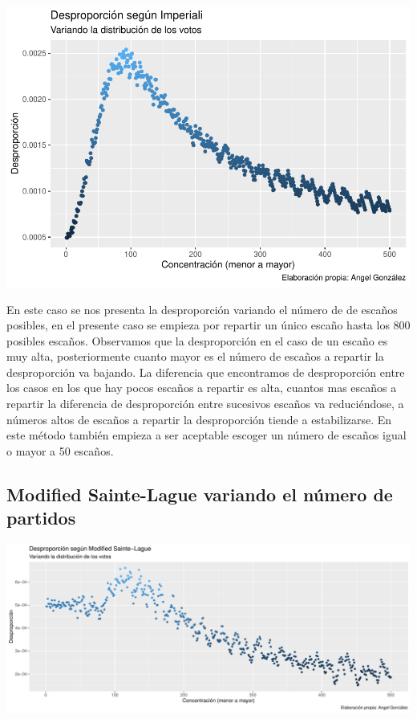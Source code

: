 \documentclass[12pt,a4paper,]{book}
\numberwithin{dummy}{section}
\theoremstyle{ocrenumbox}
\theoremstyle{blacknumex}
\theoremstyle{blacknumbox}
\theoremstyle{ocrenum}
\theoremstyle{ocrenum}
\begin{document}
\begin{center}\includegraphics[width=0.95\linewidth]{figurasR/unnamed-chunk-23-1} \end{center}

En este caso se nos presenta la desproporción variando el número de de
escaños posibles, en el presente caso se empieza por repartir un único
escaño hasta los 800 posibles escaños. Observamos que la desproporción
en el caso de un escaño es muy alta, posteriormente cuanto mayor es el
número de escaños a repartir la desproporción va bajando. La diferencia
que encontramos de desproporción entre los casos en los que hay pocos
escaños a repartir es alta, cuantos mas escaños a repartir la diferencia
de desproporción entre sucesivos escaños va reduciéndose, a números
altos de escaños a repartir la desproporción tiende a estabilizarse. En
este método también empieza a ser aceptable escoger un número de escaños
igual o mayor a 50 escaños.

\hypertarget{modified-sainte-lague-variando-el-nuxfamero-de-partidos}{%
\subsection{Modified Sainte-Lague variando el número de
partidos}\label{modified-sainte-lague-variando-el-nuxfamero-de-partidos}}

\begin{center}\includegraphics[width=0.95\linewidth]{figurasR/unnamed-chunk-24-1} \end{center}
\end{document}
